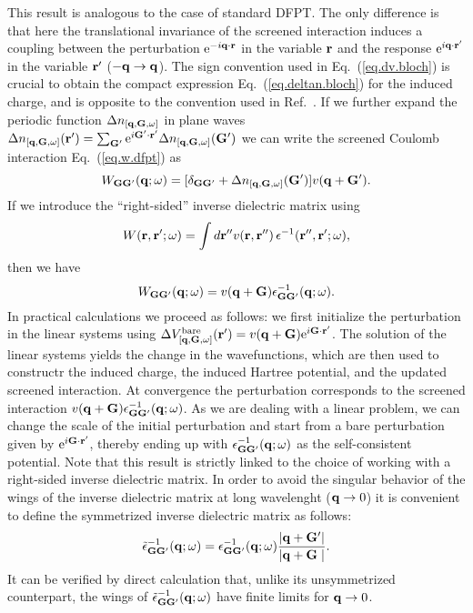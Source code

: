 \documentclass[twocolumn,prb,showpacs,superscriptaddress]{revtex4}
\def\w{\omega}
\def\q{{\bf q}}
\def\G{{\bf G}}
\def\Gp{{\bf G^\prime}}
\def\r{{\bf r}}
\def\rp{{\bf r^\prime}}
\def\rpp{{\bf r^{\prime\prime}}}
\begin{document}
This result is analogous to the case of standard DFPT. The only difference is that
here the translational invariance of the screened interaction induces a coupling
between the perturbation ${\rm e}^{-i\q\cdot\r}$ in the variable $\r$ and the response
${\rm e}^{i\q\cdot\rp}$ in the variable $\rp$ ($-\q \rightarrow \q$).
The sign convention used in Eq.\ (\ref{eq.dv.bloch}) is crucial to obtain
the compact expression Eq.\ (\ref{eq.deltan.bloch}) for the induced charge,
and is opposite to the convention used in Ref.\ .
If we further expand the periodic function $\Delta n_{[\q,\G,\w]}$ in plane
waves $\Delta n_{[\q,\G,\w]}(\rp)=\sum_\Gp {\rm e}^{i\Gp\cdot\rp} \Delta n_{[\q,\G,\w]}(\Gp)$
we can write the screened Coulomb interaction Eq.\ (\ref{eq.w.dfpt}) as
  \begin{equation}
  W_{\G\Gp}(\q;\w) = [\delta_{\G\Gp} + \Delta n_{[\q,\G,\w]}(\Gp) ]v(\q+\Gp).
  \end{equation}
If we introduce the ``right-sided'' inverse dielectric matrix using
  \begin{equation}
  W(\r,\rp;\w) = \int d\rpp v(\r,\rpp) \, \epsilon^{-1}(\rpp,\rp;\w),
  \end{equation}
then we have
  \begin{equation}\label{eq.Wg}
  W_{\G\Gp}(\q;\w) = v(\q+\G)  \epsilon^{-1}_{\G\Gp}(\q;\w).
  \end{equation}
In practical calculations we proceed as follows: we first initialize the perturbation
in the linear systems using $\Delta V^{\rm bare}_{[\q,\G,\w]}(\rp) = v(\q+\G) {\rm e}^{i\G\cdot\rp}$.
The solution of the linear systems yields the change in the wavefunctions,
which are then used to constructr the induced charge, the induced Hartree potential,
and the updated screened interaction. At convergence the perturbation corresponds to
the screened interaction $v(\q+\G) \epsilon^{-1}_{\G\Gp}(\q;\w)$.
%
As we are dealing with a linear problem, we can change the scale of the initial
perturbation and start from a bare perturbation given by ${\rm e}^{i\G\cdot\rp}$,
thereby ending up with $\epsilon^{-1}_{\G\Gp}(\q;\w)$ as the self-consistent potential.
Note that this result is strictly linked to the choice of working with a right-sided 
inverse dielectric matrix. 
%
In order to avoid the singular behavior of the wings of the inverse dielectric matrix 
at long wavelenght ($\q\rightarrow 0$) it is convenient to define the symmetrized inverse
dielectric matrix as follows:\cite{balde_tosa}
  \begin{equation}
  \tilde\epsilon^{-1}_{\G\Gp}(\q;\w) = \epsilon^{-1}_{\G\Gp}(\q;\w)  \frac{|\q+\Gp|}{|\q+\G\phantom{^\prime}|}.
  \end{equation}
It can be verified by direct calculation that, unlike its unsymmetrized counterpart,
the wings of $\tilde\epsilon^{-1}_{\G\Gp}(\q;\w)$ have finite limits for $\q\rightarrow 0$.
\end{document}
